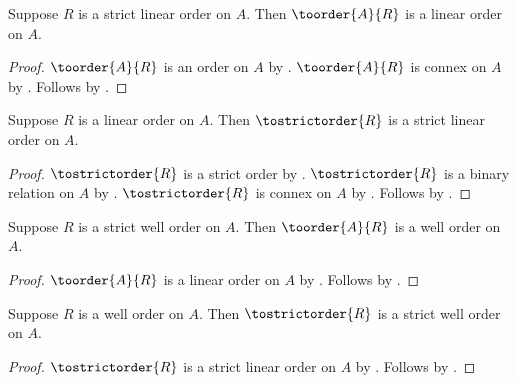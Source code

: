 \begin{proposition}\label{linear_order_from_strict_linear_order}
    Suppose $R$ is a strict linear order on $A$.
    Then $\toorder{A}{R}$ is a linear order on $A$.
\end{proposition}
\begin{proof}
    $\toorder{A}{R}$ is an order on $A$
        by .
    $\toorder{A}{R}$ is connex on $A$
        by .
    Follows by .
\end{proof}

\begin{proposition}\label{strict_linear_order_from_linear_order}
    Suppose $R$ is a linear order on $A$.
    Then $\tostrictorder{R}$ is a strict linear order on $A$.
\end{proposition}
\begin{proof}
    $\tostrictorder{R}$ is a strict order
        by .
    $\tostrictorder{R}$ is a binary relation on $A$
        by .
    $\tostrictorder{R}$ is connex on $A$
        by .
    Follows by .
\end{proof}

\begin{theorem}\label{well_order_from_strict_well_order}
    Suppose $R$ is a strict well order on $A$.
    Then $\toorder{A}{R}$ is a well order on $A$.
\end{theorem}
\begin{proof}
    $\toorder{A}{R}$ is a linear order on $A$
        by .
    Follows by .
\end{proof}

\begin{theorem}\label{strict_well_order_from_well_order}
    Suppose $R$ is a well order on $A$.
    Then $\tostrictorder{R}$ is a strict well order on $A$.
\end{theorem}
\begin{proof}
    $\tostrictorder{R}$ is a strict linear order on $A$
        by .
    Follows by .
\end{proof}
